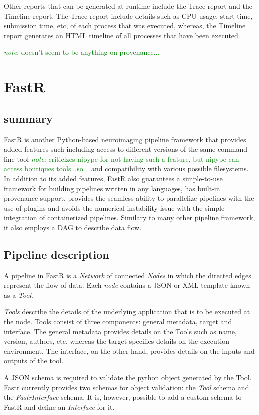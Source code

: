 \documentclass{report}
\newcommand{\note}[1]{\textcolor{green}{\textit{note}: #1}}
\begin{document}
    Other reports that can be generated at runtime include the Trace report and
the Timeline report. The Trace report include details such as CPU usage, start
time, submission time, etc, of each process that was executed, whereas, the
Timeline report generates an HTML timeline of all processes that have been
executed.        

    \note{doesn't seem to be anything on provenance...}

    \section{FastR}
        \subsection{summary}
        FastR is another Python-based neuroimaging pipeline framework that
provides added features such including access to different versions of the same
command-line tool \note{criticizes nipype for not having such a feature, but
nipype can access boutiques tools...so...} and compatibility with various
possible filesystems. In addition to its added features, FastR also guarantees
a simple-to-use framework for building pipelines written in any languages, has
built-in provenance support, provides the seamless ability to parallelize
pipelines with the use of plugins and avoids the numerical instability issue with
the simple integration of containerized pipelines. Similary to many other
pipeline framework, it also employs a DAG to describe data flow.
 
        \subsection{Pipeline description}

        A pipeline in FastR is a \textit{Network} of connected \textit{Nodes} in
which the directed edges represent the flow of data.  Each \textit{node}
contains a JSON or XML template known as a \textit{Tool}. 

\textit{Tools}
describe the details of the underlying application that is to be executed at the
node. Tools consist of three components: general metadata, target and interface.
The general metadata provides details on the Tools such as name, version,
authors, etc, whereas the target specifies details on the execution environment.
The interface, on the other hand, provides details on the inputs and outputs of
the tool. 

A JSON schema is required to validate the python object generated by the Tool. 
Fastr currently provides two schemas for object validation: the \textit{Tool} schema
and the \textit{FastrInterface} schema. It is, however, possible to add a custom
schema to FastR and define an \textit{Interface} for it. 
\end{document}
